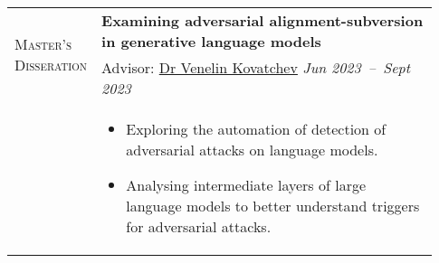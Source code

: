 \documentclass[letterpaper, 10pt, oneside]{article}
\newcommand{\stitle}[1]{\normalsize{\textsc{#1}}}
\newcommand{\bdit}[1]{{\textbf{#1}}}
\begin{document}
\begin{longtable}{@{} p{0.13\linewidth} p{0.8\linewidth}}
      \multirow{2}{6.5em}{\stitle{Master's Disseration}}   & \bdit{Examining adversarial alignment-subversion in generative language models}                                                                                                               \\
                                                      & Advisor: \href{https://vkovatchev.com/}{Dr Venelin Kovatchev} \hfill \textsl{Jun 2023\ --\ Sept 2023}                                                                                   \\
                                                      & \parbox{0.8\textwidth}{                                                                                                                                                                               %
        \begin{itemize}[leftmargin=*, itemsep=-0.70ex, topsep=-0.88ex]
            \item Exploring the automation of detection of adversarial attacks on language models.
            \item Analysing intermediate layers of large language models to better understand triggers for adversarial attacks.
        \end{itemize}
    }
    \\
    \\


\end{longtable}
\end{document}
